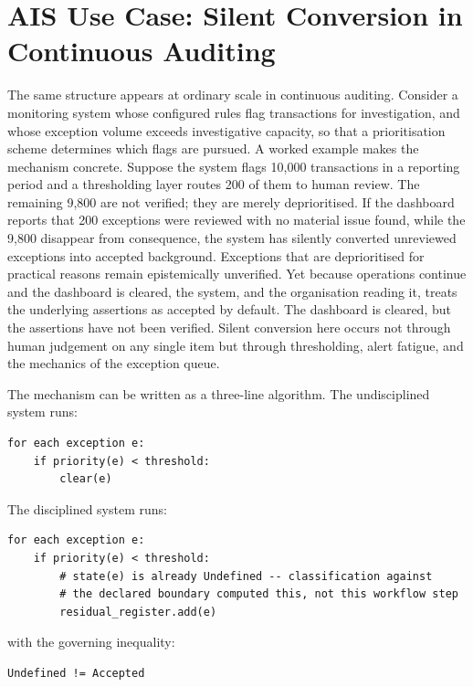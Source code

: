 \documentclass[11pt,a4paper]{article}
\theoremstyle{definition}
\theoremstyle{remark}
\begin{document}
\section{AIS Use Case: Silent Conversion in Continuous Auditing}
\label{sec:ca-case}

The same structure appears at ordinary scale in continuous auditing. Consider a monitoring system whose configured rules flag transactions for investigation, and whose exception volume exceeds investigative capacity, so that a prioritisation scheme determines which flags are pursued. A worked example makes the mechanism concrete. Suppose the system flags 10{,}000 transactions in a reporting period and a thresholding layer routes 200 of them to human review. The remaining 9{,}800 are not verified; they are merely deprioritised. If the dashboard reports that 200 exceptions were reviewed with no material issue found, while the 9{,}800 disappear from consequence, the system has silently converted unreviewed exceptions into accepted background. Exceptions that are deprioritised for practical reasons remain epistemically unverified. Yet because operations continue and the dashboard is cleared, the system, and the organisation reading it, treats the underlying assertions as accepted by default. The dashboard is cleared, but the assertions have not been verified. Silent conversion here occurs not through human judgement on any single item but through thresholding, alert fatigue, and the mechanics of the exception queue.

The mechanism can be written as a three-line algorithm. The undisciplined system runs:

\begin{lstlisting}[numbers=none]
for each exception e:
    if priority(e) < threshold:
        clear(e)
\end{lstlisting}

The disciplined system runs:

\begin{lstlisting}[numbers=none]
for each exception e:
    if priority(e) < threshold:
        # state(e) is already Undefined -- classification against
        # the declared boundary computed this, not this workflow step
        residual_register.add(e)
\end{lstlisting}

with the governing inequality:

\begin{lstlisting}[numbers=none]
Undefined != Accepted
\end{lstlisting}
\end{document}
